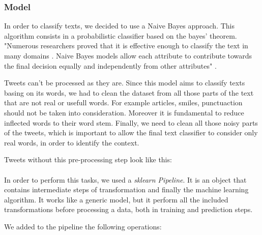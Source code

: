 \subsubsection{Model}
In order to classify texts, we decided to use a Naive Bayes approach. This algorithm consists in a probabilistic classifier based on the bayes' theorem. "Numerous researchers proved that it is effective enough to classify the text in many domains \cite{svm}. Naive Bayes models allow each attribute to contribute towards the final decision equally and independently from other attributes" \cite{nb}.

Tweets can't be processed as they are. Since this model aims to classify texts basing on its words, we had to clean the dataset from all those parts of the text that are not real or usefull words. For example articles, smiles, punctuaction should not be taken into consideration. Moreover it is fundamental to reduce inflected words to their word stem. Finally, we need to clean all those noisy parts of the tweets, which is important to allow the final text classifier to consider only real words, in order to identify the context.

Tweets without this pre-processing step look like this:\\

\\

In order to perform this tasks, we used a \textit{sklearn Pipeline}. It is an object that contains intermediate steps of transformation and finally the machine learning algorithm. It works like a generic model, but it perform all the included transformations before processing a data, both in training and prediction steps.

We added to the pipeline the following operations:

